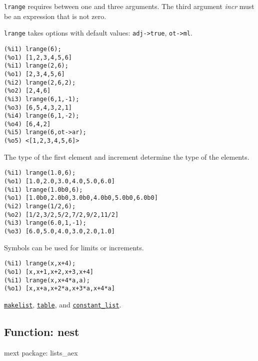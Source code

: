 \documentclass[]{article}
\begin{document}
\vspace{5 pt}

   {\tt lrange} requires between one and three arguments.
    The third argument {\it incr} must be an expression that is not zero.


\vspace{5 pt}

{\tt lrange} takes options with default values: {\tt adj->true}, {\tt ot->ml}.
\vspace{5 pt}


\begin{Verbatim}[frame=single]
(%i1) lrange(6);
(%o1) [1,2,3,4,5,6]
(%i1) lrange(2,6);
(%o1) [2,3,4,5,6]
(%i2) lrange(2,6,2);
(%o2) [2,4,6]
(%i3) lrange(6,1,-1);
(%o3) [6,5,4,3,2,1]
(%i4) lrange(6,1,-2);
(%o4) [6,4,2]
(%i5) lrange(6,ot->ar);
(%o5) <[1,2,3,4,5,6]>
\end{Verbatim}

   The type of the first element and increment determine the type of the 
   elements. 

\begin{Verbatim}[frame=single]
(%i1) lrange(1.0,6);
(%o1) [1.0,2.0,3.0,4.0,5.0,6.0]
(%i1) lrange(1.0b0,6);
(%o1) [1.0b0,2.0b0,3.0b0,4.0b0,5.0b0,6.0b0]
(%i2) lrange(1/2,6);
(%o2) [1/2,3/2,5/2,7/2,9/2,11/2]
(%i3) lrange(6.0,1,-1);
(%o3) [6.0,5.0,4.0,3.0,2.0,1.0]
\end{Verbatim}

   Symbols can be used for limits or increments. 

\begin{Verbatim}[frame=single]
(%i1) lrange(x,x+4);
(%o1) [x,x+1,x+2,x+3,x+4]
(%i1) lrange(x,x+4*a,a);
(%o1) [x,x+a,x+2*a,x+3*a,x+4*a]
\end{Verbatim}


  \hyperlink{makelist}{{\tt makelist}}, \hyperlink{table}{{\tt table}}, and \hyperlink{constant_list}{{\tt constant\_list}}.

\vspace{5 pt}


\subsection{Function: nest\label{sec:nest}}
\hypertarget{nest}{}


\noindent mext package: lists\_aex
\end{document}
